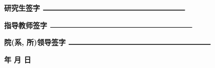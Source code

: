 \begin{titlepage}
\begin{CJK*}{UTF8}{gkai}

\null %
\vfill
\Large    
\flushleft
\setlength{\leftskip}{3cm}

    \textbf{研究生签字} \hspace{1.9cm} $\rule{7cm}{0.3mm}$ 

    
\vspace{0.5cm}
    
    \textbf{指导教师签字} \hspace{1.3cm} $\rule{7cm}{0.3mm}$ 


\vspace{0.5cm}

    \textbf{院(系, 所)领导签字} \hspace{0cm} $\rule{7cm}{0.3mm}$ 

    
\flushright

    \textbf{年 \qquad 月 \qquad 日} 

\end{CJK*}

\end{titlepage}